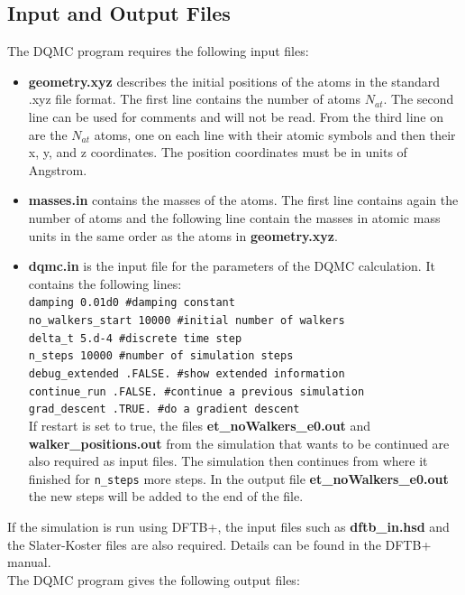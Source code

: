 \documentclass [12pt]{report}
\begin{document}
\begin{appendices}
\chapter{Input and Output Files} \label{inout}
The DQMC program requires the following input files:
\begin{itemize}
\item \textbf{geometry.xyz} describes the initial positions of the atoms in the standard .xyz file format. The first line contains the number of atoms $N_{at}$. The second line can be used for comments and will not be read. From the third line on are the $N_{at}$ atoms, one on each line with their atomic symbols and then their x, y, and z coordinates. The position coordinates must be in units of Angstrom.
\item \textbf{masses.in} contains the masses of the atoms. The first line contains again the number of atoms and the following line contain the masses in atomic mass units in the same order as the atoms in \textbf{geometry.xyz}.
\item \textbf{dqmc.in} is the input file for the parameters of the DQMC calculation. It contains the following lines:\\
\verb+damping 0.01d0 #damping constant+\\
\verb+no_walkers_start 10000 #initial number of walkers+\\
\verb+delta_t 5.d-4 #discrete time step+\\
\verb+n_steps 10000 #number of simulation steps+\\
\verb+debug_extended .FALSE. #show extended information+\\
\verb+continue_run .FALSE. #continue a previous simulation+\\
\verb+grad_descent .TRUE. #do a gradient descent+\\
If restart is set to true, the files \textbf{et\_noWalkers\_e0.out} and \textbf{walker\_positions.out} from the simulation that wants to be continued are also required as input files. The simulation then continues from where it finished for \verb+n_steps+ more steps. In the output file \textbf{et\_noWalkers\_e0.out} the new steps will be added to the end of the file.
\end{itemize}
If the simulation is run using DFTB+, the input files such as \textbf{dftb\_in.hsd} and the Slater-Koster files are also required. Details can be found in the DFTB+ manual\cite{dftbp_manual}.\\
\newpage
The DQMC program gives the following output files:

\end{appendices}
\end{document}
